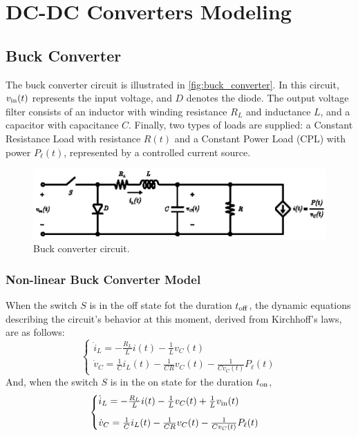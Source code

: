 \chapter{DC-DC Converters Modeling}

\section{Buck Converter}

The buck converter circuit is illustrated in \autoref{fig:buck_converter}. In this circuit, $v_{\rm{in}}(t)$ represents the input voltage, and $D$ denotes the diode. The output voltage filter consists of an inductor with winding resistance $R_L$ and inductance $L$, and a capacitor with capacitance $C$. Finally, two types of loads are supplied: a Constant Resistance Load with resistance $R(t)$ and a Constant Power Load (CPL) with power $P_{\ell}(t)$, represented by a controlled current source.

\begin{figure}[h]
  \centering
  \includegraphics[scale=1.]{figures/buck_converter.eps}
  \caption{Buck converter circuit.}
  \label{fig:buck_converter}
\end{figure}

\subsection{Non-linear Buck Converter Model}

When the switch $S$ is in the off state fot the duration $t_{\rm{off}}$, the dynamic equations describing the circuit's behavior at this moment, derived from Kirchhoff's laws, are as follows:
\begin{equation}
  \begin{cases}
    \dot i_L = - \frac{R_L} L i(t) - \frac{1}{L} v_C(t) \\[8pt]
    \dot v_C = \frac{1}{C} i_L(t) - \frac{1}{C R} v_C(t) - \frac{1}{C v_C(t)} P_{\ell}(t)
  \end{cases}
  \label{eq:buck_state_off}
\end{equation}
And, when the switch $S$ is in the on state for the duration $t_{\rm{on}}$,
\begin{equation}
  \begin{cases}
    \dot i_L = - \frac{R_L} L i(t) - \frac{1}{L} v_C(t) + \frac{1}{L} v_{\rm{in}}(t) \\[8pt]
    \dot v_C = \frac{1}{C} i_L(t) - \frac{1}{C R} v_C(t) - \frac{1}{C v_C(t)} P_{\ell}(t)
  \end{cases}
  \label{eq:buck_state_on}
\end{equation}

